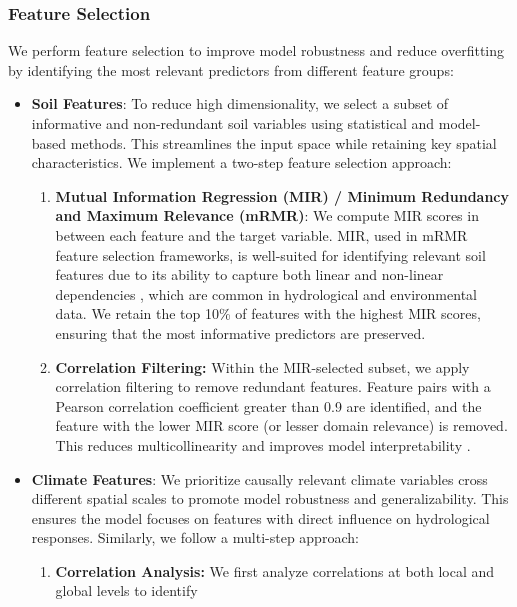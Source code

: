 \documentclass[ruler]{CUP-JNL-EDS}%
\begin{document}
\subsubsection{Feature Selection}
We perform feature selection to improve model robustness and reduce overfitting by identifying the most 
relevant predictors from different feature groups:
\begin{itemize}
    \item \textbf{Soil Features}: To reduce high dimensionality, we select a subset of informative and 
    non-redundant soil variables using statistical and model-based methods. This streamlines the 
    input space while retaining key spatial characteristics. We implement a two-step feature selection approach:
    \begin{enumerate}
        \item \textbf{Mutual Information Regression (MIR)  / Minimum Redundancy and Maximum Relevance (mRMR)}: We compute MIR scores in between each feature and the 
        target variable. MIR, used in mRMR feature selection frameworks, is well-suited for identifying relevant soil features due to its ability to capture both 
        linear and non-linear dependencies \citep{peng2005}, which are common in hydrological and environmental data. We retain 
        the top 10\% of features with the highest MIR scores, ensuring that the most informative predictors 
        are preserved.
        \vspace{5mm}
        \item \textbf{Correlation Filtering:} Within the MIR-selected subset, we apply correlation filtering to 
        remove redundant features. Feature pairs with a Pearson correlation coefficient greater than 0.9 are 
        identified, and the feature with the lower MIR score (or lesser domain relevance) is removed. This 
        reduces multicollinearity and improves model interpretability \citep{kuhnjohnson2019}.
    \end{enumerate}
    \item\textbf{Climate Features}: We prioritize causally relevant climate variables cross different spatial scales to promote model robustness 
    and generalizability. This ensures the model focuses on features with direct influence on hydrological responses. Similarly, we follow a 
    multi-step approach:
    \begin{enumerate}
        \item \textbf{Correlation Analysis:} We first analyze correlations at both local and global levels to identify 

\end{enumerate}
\end{itemize}
\end{document}
